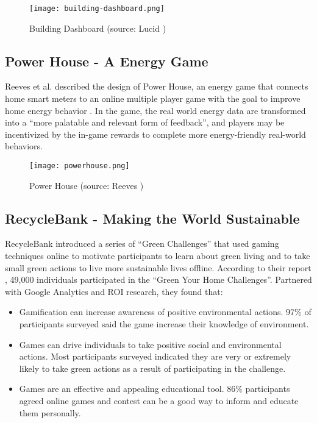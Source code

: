 \begin{figure}[htbp]
	\centering
		\texttt{[image: building-dashboard.png]}
		\caption{Building Dashboard (source: Lucid \cite{building-dashboard})}
		\label{fig:building-dashboard}
\end{figure}

\subsection{Power House - A Energy Game}

Reeves et al. described the design of Power House, an energy game that connects
home smart meters to an online multiple player game with the goal to improve
home energy behavior \cite{Reeves2011powerhouse}. In the game, the real world
energy data are transformed into a ``more palatable and relevant form of
feedback'', and players may be incentivized by the in-game rewards to complete
more energy-friendly real-world behaviors.

\begin{figure}[htbp]
	\centering
		\texttt{[image: powerhouse.png]}
		\caption{Power House (source: Reeves \cite{Reeves2011powerhouse})}
		\label{fig:powerhouse}
\end{figure}

\subsection{RecycleBank - Making the World Sustainable}

RecycleBank \cite {recyclebank} introduced a series of ``Green Challenges'' that used gaming techniques online to motivate participants to learn about green living and to take small green actions to live more sustainable lives offline. According to their report \cite {gamingforgood}, 49,000 individuals participated in the ``Green Your Home Challenges''. Partnered with Google Analytics and ROI research, they found that:
\begin{itemize}
	\item Gamification can increase awareness of positive environmental actions. 97\% of participants surveyed said the game increase their knowledge of environment.
	\item Games can drive individuals to take positive social and environmental actions. Most participants surveyed indicated they are very or extremely likely to take green actions as a result of participating in the challenge.
	\item Games are an effective and appealing educational tool. 86\% participants agreed online games and contest can be a good way to inform and educate them personally.
\end{itemize}

